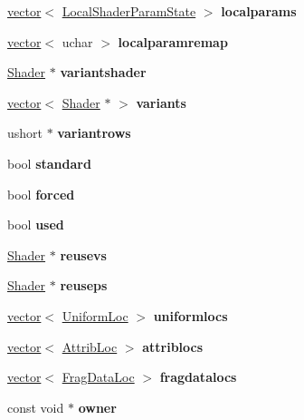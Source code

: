 \begin{DoxyCompactItemize}
\hyperlink{structvector}{vector}$<$ \hyperlink{struct_local_shader_param_state}{Local\+Shader\+Param\+State} $>$ {\bfseries localparams}
\item 
\mbox{\label{struct_shader_ac9a753b7011b05760c7339f9ad7edd22}} 
\hyperlink{structvector}{vector}$<$ uchar $>$ {\bfseries localparamremap}
\item 
\mbox{\label{struct_shader_a429ab8ad69af4f717594acdaba0cd68b}} 
\hyperlink{struct_shader}{Shader} $\ast$ {\bfseries variantshader}
\item 
\mbox{\label{struct_shader_af860182908a3cb7634388e189ec9789a}} 
\hyperlink{structvector}{vector}$<$ \hyperlink{struct_shader}{Shader} $\ast$ $>$ {\bfseries variants}
\item 
\mbox{\label{struct_shader_a703782d5000f84e5712adca1d91128fe}} 
ushort $\ast$ {\bfseries variantrows}
\item 
\mbox{\label{struct_shader_af90f159183f3f306ab46c4c9c1208af6}} 
bool {\bfseries standard}
\item 
\mbox{\label{struct_shader_ab3d931df1f7cf8ddbe325065a6f18e90}} 
bool {\bfseries forced}
\item 
\mbox{\label{struct_shader_a4ccf963b54bd3e4721893ad94377b317}} 
bool {\bfseries used}
\item 
\mbox{\label{struct_shader_a1747d276125028fa9ca2fd3f9104c7cf}} 
\hyperlink{struct_shader}{Shader} $\ast$ {\bfseries reusevs}
\item 
\mbox{\label{struct_shader_af433d0fb557d9eb18ca5befe8f20fc4e}} 
\hyperlink{struct_shader}{Shader} $\ast$ {\bfseries reuseps}
\item 
\mbox{\label{struct_shader_aeb9b15892b1ae9120ee117af7ed47290}} 
\hyperlink{structvector}{vector}$<$ \hyperlink{struct_uniform_loc}{Uniform\+Loc} $>$ {\bfseries uniformlocs}
\item 
\mbox{\label{struct_shader_a52c219e4b8f1e8d2b828bd758781d6ac}} 
\hyperlink{structvector}{vector}$<$ \hyperlink{struct_attrib_loc}{Attrib\+Loc} $>$ {\bfseries attriblocs}
\item 
\mbox{\label{struct_shader_a949d0fbb56c6478cc78a08fe9b36d519}} 
\hyperlink{structvector}{vector}$<$ \hyperlink{struct_frag_data_loc}{Frag\+Data\+Loc} $>$ {\bfseries fragdatalocs}
\item 
\mbox{\label{struct_shader_a1f9363fb35ec2b331ac577e5d160a484}} 
const void $\ast$ {\bfseries owner}
\end{DoxyCompactItemize}
